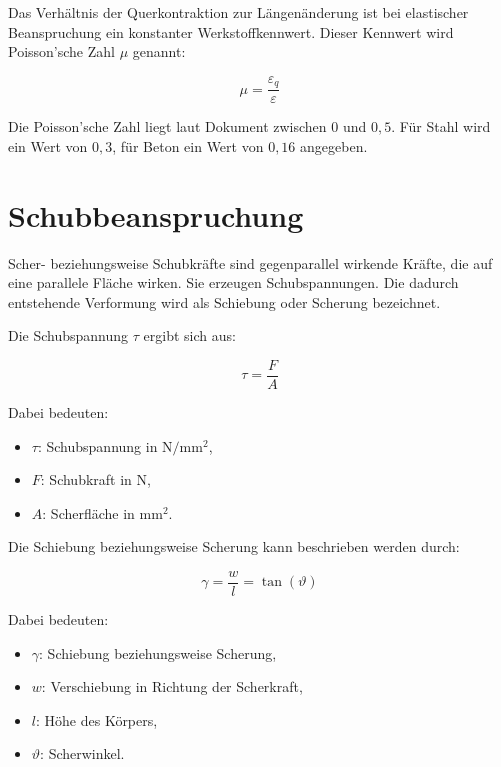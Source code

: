 \documentclass[
  12pt,
  a4paper,
  oneside
]{scrreprt}
\begin{document}
Das Verhältnis der Querkontraktion zur Längenänderung ist bei
elastischer Beanspruchung ein konstanter Werkstoffkennwert. Dieser
Kennwert wird Poisson'sche Zahl $\mu$ genannt:

\begin{equation}
  \mu = \frac{\varepsilon_q}{\varepsilon}
\end{equation}

Die Poisson'sche Zahl liegt laut Dokument zwischen $0$ und $0{,}5$.
Für Stahl wird ein Wert von $0{,}3$, für Beton ein Wert von $0{,}16$
angegeben. 

\section{Schubbeanspruchung}

Scher- beziehungsweise Schubkräfte sind gegenparallel wirkende Kräfte,
die auf eine parallele Fläche wirken. Sie erzeugen Schubspannungen.
Die dadurch entstehende Verformung wird als Schiebung oder Scherung
bezeichnet. 

Die Schubspannung $\tau$ ergibt sich aus:

\begin{equation}
  \tau = \frac{F}{A}
\end{equation}

Dabei bedeuten:

\begin{itemize}
  \item $\tau$: Schubspannung in $\mathrm{N/mm^2}$,
  \item $F$: Schubkraft in $\mathrm{N}$,
  \item $A$: Scherfläche in $\mathrm{mm^2}$.
\end{itemize}

Die Schiebung beziehungsweise Scherung kann beschrieben werden durch:

\begin{equation}
  \gamma = \frac{w}{l} = \tan(\vartheta)
\end{equation}

Dabei bedeuten:

\begin{itemize}
  \item $\gamma$: Schiebung beziehungsweise Scherung,
  \item $w$: Verschiebung in Richtung der Scherkraft,
  \item $l$: Höhe des Körpers,
  \item $\vartheta$: Scherwinkel.
\end{itemize}
\end{document}
